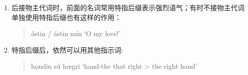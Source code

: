\begin{enumerate}
\begin{enumerate}
          \item 后接物主代词时，前面的名词常用特指后缀表示强烈语气；有时不接物主代词单独使用特指后缀也有这样的作用：
                \begin{quote}
                  ástin / ástin mín `O my love!'
                \end{quote}

          \item 特指后缀后，依然可以用其他指示词:
                \begin{quote}
                  hǫndin sú hœgri `hand-the that right > the right hand'
                \end{quote}

        \end{enumerate}

\end{enumerate}
